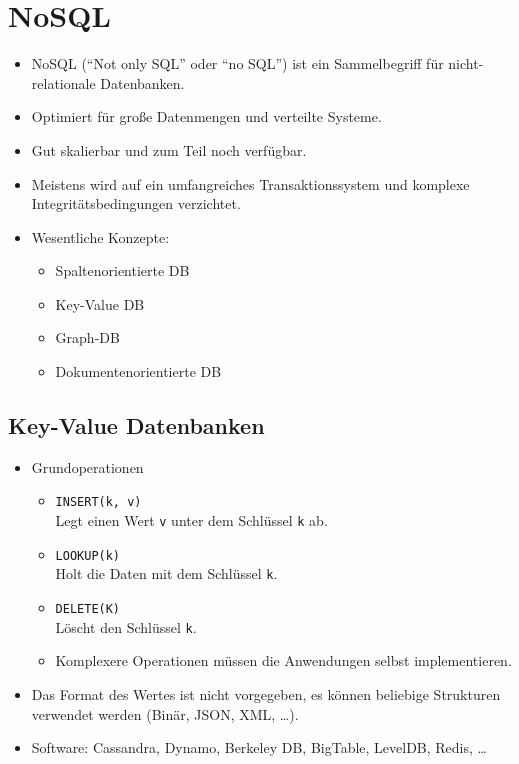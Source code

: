     \section{NoSQL} %
        \begin{itemize}
        	\item NoSQL (\enquote{Not only SQL} oder \enquote{no SQL}) ist ein Sammelbegriff für nicht-relationale Datenbanken.
        	\item Optimiert für große Datenmengen und verteilte Systeme.
        	\item Gut skalierbar und zum Teil noch verfügbar.
        	\item Meistens wird auf ein umfangreiches Transaktionssystem und komplexe Integritätsbedingungen verzichtet.
        	\item Wesentliche Konzepte:
        		\begin{itemize}
        			\item Spaltenorientierte DB
        			\item Key-Value DB
        			\item Graph-DB
        			\item Dokumentenorientierte DB
        		\end{itemize}
        \end{itemize}

        \subsection{Key-Value Datenbanken} %
            \begin{itemize}
            	\item Grundoperationen
            		\begin{itemize}
            			\item \texttt{INSERT(k, v)} \\ Legt einen Wert \texttt{v} unter dem Schlüssel \texttt{k} ab.
            			\item \texttt{LOOKUP(k)} \\ Holt die Daten mit dem Schlüssel \texttt{k}.
            			\item \texttt{DELETE(K)} \\ Löscht den Schlüssel \texttt{k}.
            			\item Komplexere Operationen müssen die Anwendungen selbst implementieren.
            		\end{itemize}
            	\item Das Format des Wertes ist nicht vorgegeben, es können beliebige Strukturen verwendet werden (Binär, JSON, XML, \dots).
            	\item Software: Cassandra, Dynamo, Berkeley DB, BigTable, LevelDB, Redis, \dots
            \end{itemize}

